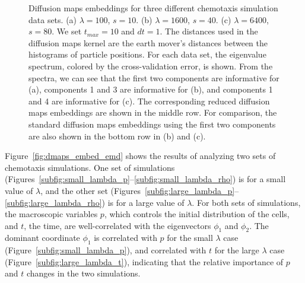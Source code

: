 \documentclass[3p]{elsarticle}
\begin{document}
\begin{figure}[t]
\begin{subfigure}[t]{2in}
\caption{}
\end{subfigure}
%
\caption{Diffusion maps embeddings for three different chemotaxis simulation data sets. (a) $\lambda = 100$, $s = 10$. (b) $\lambda = 1600$, $s = 40$. (c) $\lambda = 6400$, $s = 80$. We set $t_{max} = 10$ and $dt=1$. The distances used in the diffusion maps kernel are the earth mover's distances between the histograms of particle positions. For each data set, the eigenvalue spectrum, colored by the cross-validation error, is shown. From the spectra, we can see that the first two components are informative for (a), components 1 and 3 are informative for (b), and components 1 and 4 are informative for (c). The corresponding reduced diffusion maps embeddings are shown in the middle row. For comparison, the standard diffusion maps embeddings using the first two components are also shown in the bottom row in (b) and (c).}
%
\label{fig:chemotaxis_simulations_harmonics}
\end{figure}

Figure~\ref{fig:dmaps_embed_emd} shows the results of analyzing two sets of chemotaxis simulations. 
%
One set of simulations (Figures~\ref{subfig:small_lambda_p}--\ref{subfig:small_lambda_rho}) is for a small value of $\lambda$, and the other set (Figures~\ref{subfig:large_lambda_p}--\ref{subfig:large_lambda_rho}) is for a large value of $\lambda$. 
%
For both sets of simulations, the macroscopic variables $p$, which controls the initial distribution of the cells, and $t$, the time, are well-correlated with the eigenvectors $\phi_1$ and $\phi_2$. 
%
%
The dominant coordinate $\phi_1$ is correlated with $p$ for the small $\lambda$ case (Figure~\ref{subfig:small_lambda_p}), and correlated with $t$ for the large $\lambda$ case (Figure~\ref{subfig:large_lambda_t}), indicating that the relative importance of $p$ and $t$ changes in the two simulations.
%
\end{document}
